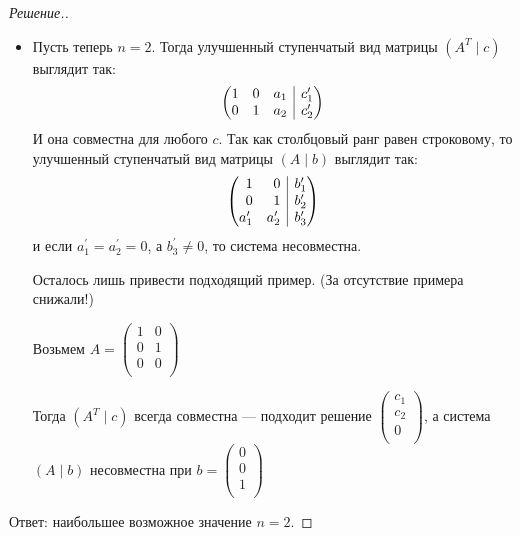 \documentclass[a4paper]{article}
\makeatletter
\theoremstyle{remark}
\newenvironment{sysmatrix}[1]
{
    \left(\begin{array}{@{}#1@{}}
}
{\end{array}\right)}
\newcommand{\smt}[2]{\begin{sysmatrix}{#1} #2\end{sysmatrix}}
\makeatother
\begin{document}
\begin{proof}[Решение.]
\begin{itemize}
                \item Пусть теперь $n = 2$. Тогда улучшенный ступенчатый вид матрицы 
                $(A^T \mid c)$ выглядит так:
                \[\smt{rrr|r} {
                    1 & 0 & a_1 & c_1^{\prime} \\
                    0 & 1 & a_2 & c_2^{\prime} \\
                }\]
                И она совместна для любого $c$. Так как столбцовый ранг равен строковому, то 
                улучшенный ступенчатый вид матрицы 
                $(A \mid b)$ выглядит так:
                \[\smt{rr|r} {
                    1 & 0 & b_1^{\prime} \\
                    0 & 1 & b_2^{\prime} \\
                    a_1^\prime & a_2^\prime & b_3^{\prime} \\
                }\]
                и если $a_1^\prime = a_2^\prime = 0$, а $b_3^{\prime} \neq 0$, то 
                система несовместна. 

                Осталось лишь привести подходящий пример. (За отсутствие примера снижали!)

                Возьмем $A = 
                \begin{pmatrix}
                    1 & 0 \\ 
                    0 & 1  \\ 
                    0 & 0 \\ 
                \end{pmatrix} $
                
                Тогда $(A^T \mid c)$ всегда совместна --- подходит решение 
                $\begin{pmatrix}
                    c_1 \\ 
                    c_2 \\ 
                    0 \\ 
                \end{pmatrix}$, а система $(A \mid b)$ несовместна при $b = 
                \begin{pmatrix}
                    0 \\ 
                    0 \\ 
                    1 \\ 
                \end{pmatrix}$
            \end{itemize}

            Ответ: наибольшее возможное значение $n = 2$.
        \end{proof}	 
    
\end{document}
